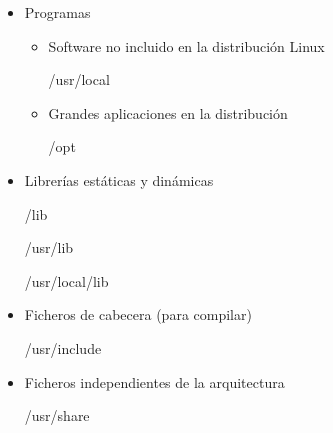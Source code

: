\documentclass[ucs]{beamer}
\begin{document}

\begin{frame}[fragile]
\begin{itemize}

\item  Programas

        \begin{itemize}
\item

Software no incluido en la distribución Linux 

/usr/local



\item
Grandes aplicaciones en la distribución

/opt


        \end{itemize}
\end{itemize}
\end{frame}


\begin{frame}[fragile]
\begin{itemize}


\item
Librerías estáticas y dinámicas

/lib

/usr/lib

/usr/local/lib

\item
Ficheros de cabecera (para compilar) 

/usr/include


\item
Ficheros independientes de la arquitectura

/usr/share



\end{itemize}
\end{frame}


\end{document}
